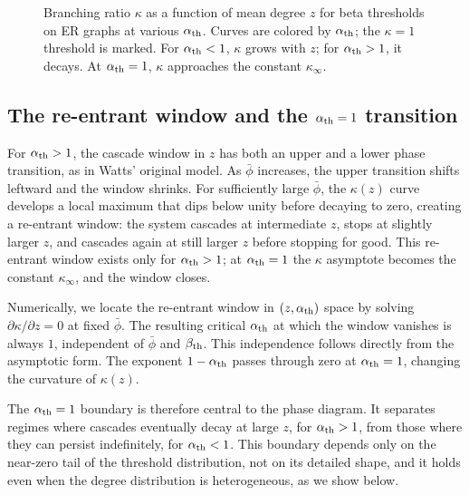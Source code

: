 \documentclass[]{revtex4-2}
\begin{document}
\begin{figure}[t]
\centering
{}
\caption{Branching ratio $\kappa$ as a function of mean degree $z$ for beta thresholds on ER graphs at various $\alpha_{\rm th}$. Curves are colored by $\alpha_{\rm th}$; the $\kappa=1$ threshold is marked. For $\alpha_{\rm th}<1$, $\kappa$ grows with $z$; for $\alpha_{\rm th}>1$, it decays. At $\alpha_{\rm th}=1$, $\kappa$ approaches the constant $\kappa_\infty$.}
\label{fig:beta-er-kappa}
\end{figure}

\subsection{The re-entrant window and the $\alpha_{\rm th}=1$ transition}

For $\alpha_{\rm th}>1$, the cascade window in $z$ has both an upper and a lower phase transition, as in Watts' original model. As $\bar\phi$ increases, the upper transition shifts leftward and the window shrinks. For sufficiently large $\bar\phi$, the $\kappa(z)$ curve develops a local maximum that dips below unity before decaying to zero, creating a re-entrant window: the system cascades at intermediate $z$, stops at slightly larger $z$, and cascades again at still larger $z$ before stopping for good. This re-entrant window exists only for $\alpha_{\rm th}>1$; at $\alpha_{\rm th}=1$ the $\kappa$ asymptote becomes the constant $\kappa_\infty$, and the window closes.

Numerically, we locate the re-entrant window in $(z,\alpha_{\rm th})$ space by solving $\partial\kappa/\partial z = 0$ at fixed $\bar\phi$. The resulting critical $\alpha_{\rm th}$ at which the window vanishes is always $1$, independent of $\bar\phi$ and $\beta_{\rm th}$. This independence follows directly from the asymptotic form. The exponent $1-\alpha_{\rm th}$ passes through zero at $\alpha_{\rm th}=1$, changing the curvature of $\kappa(z)$.

The $\alpha_{\rm th}=1$ boundary is therefore central to the phase diagram. It separates regimes where cascades eventually decay at large $z$, for $\alpha_{\rm th}>1$, from those where they can persist indefinitely, for $\alpha_{\rm th}<1$. This boundary depends only on the near-zero tail of the threshold distribution, not on its detailed shape, and it holds even when the degree distribution is heterogeneous, as we show below.
\end{document}
